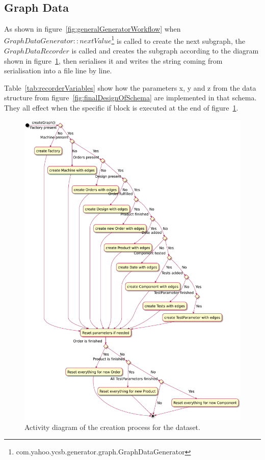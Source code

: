 \subsection{Graph Data}
\label{ch:implementation:se:graphDataRecorder}
As shown in figure~\ref{fig:generalGeneratorWorkflow} when $ GraphDataGenerator::nextValue $\footnote{com.yahoo.ycsb.generator.graph.GraphDataGenerator} is called to create the next subgraph,
the $ GraphDataRecorder $ is called and creates the subgraph according to the diagram shown in figure~\ref{fig:graphDataRecorder},
then serialises it and writes the string coming from serialisation into a file line by line.

Table~\ref{tab:recorderVariables} show how the parameters x, y and z from the data structure from figure~\ref{fig:finalDesignOfSchema} are implemented in that schema.
They all effect when the specific if block is executed at the end of figure~\ref{fig:graphDataRecorder}.

\begin{figure}[h!]
  \centering
  \includegraphics[width=\textwidth]{images/extensions/GraphDataRecorder}
  \caption{Activity diagram of the creation process for the dataset.}
  \label{fig:graphDataRecorder}
\end{figure}

